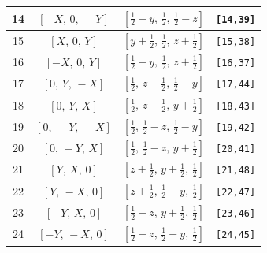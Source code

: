 \documentclass[fleqn,8pt]{jsarticle}
\begin{document}
\begin{longtable}{cccc}
14 & $\left[ - X,\, 0,\, - Y \right]$ & $\left[ \frac{1}{2} - y,\, \frac{1}{2},\, \frac{1}{2} - z \right]$ & {\tt [14,39]} \\ \hline
15 & $\left[ X,\, 0,\, Y \right]$ & $\left[ y + \frac{1}{2},\, \frac{1}{2},\, z + \frac{1}{2} \right]$ & {\tt [15,38]} \\ \hline
16 & $\left[ - X,\, 0,\, Y \right]$ & $\left[ \frac{1}{2} - y,\, \frac{1}{2},\, z + \frac{1}{2} \right]$ & {\tt [16,37]} \\ \hline
17 & $\left[ 0,\, Y,\, - X \right]$ & $\left[ \frac{1}{2},\, z + \frac{1}{2},\, \frac{1}{2} - y \right]$ & {\tt [17,44]} \\ \hline
18 & $\left[ 0,\, Y,\, X \right]$ & $\left[ \frac{1}{2},\, z + \frac{1}{2},\, y + \frac{1}{2} \right]$ & {\tt [18,43]} \\ \hline
19 & $\left[ 0,\, - Y,\, - X \right]$ & $\left[ \frac{1}{2},\, \frac{1}{2} - z,\, \frac{1}{2} - y \right]$ & {\tt [19,42]} \\ \hline
20 & $\left[ 0,\, - Y,\, X \right]$ & $\left[ \frac{1}{2},\, \frac{1}{2} - z,\, y + \frac{1}{2} \right]$ & {\tt [20,41]} \\ \hline
21 & $\left[ Y,\, X,\, 0 \right]$ & $\left[ z + \frac{1}{2},\, y + \frac{1}{2},\, \frac{1}{2} \right]$ & {\tt [21,48]} \\ \hline
22 & $\left[ Y,\, - X,\, 0 \right]$ & $\left[ z + \frac{1}{2},\, \frac{1}{2} - y,\, \frac{1}{2} \right]$ & {\tt [22,47]} \\ \hline
23 & $\left[ - Y,\, X,\, 0 \right]$ & $\left[ \frac{1}{2} - z,\, y + \frac{1}{2},\, \frac{1}{2} \right]$ & {\tt [23,46]} \\ \hline
24 & $\left[ - Y,\, - X,\, 0 \right]$ & $\left[ \frac{1}{2} - z,\, \frac{1}{2} - y,\, \frac{1}{2} \right]$ & {\tt [24,45]} \\
\end{longtable}
\renewcommand{\arraystretch}{1.2}
\end{document}

